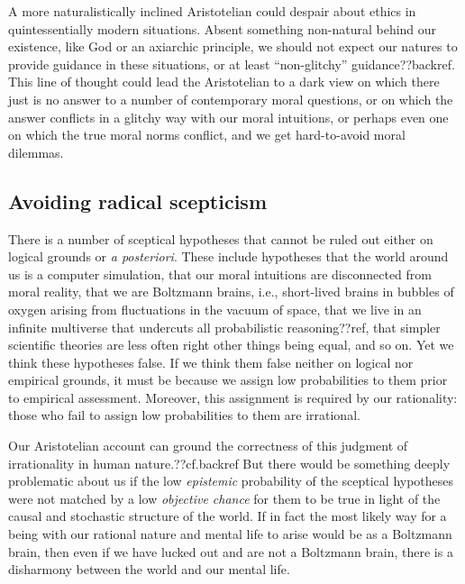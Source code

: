 A more naturalistically inclined Aristotelian could despair about ethics in quintessentially modern situations. 
Absent something non-natural behind our existence, like God or an axiarchic principle, we should not expect our natures to provide guidance in these situations, or at least ``non-glitchy''
guidance??backref. This line of thought could lead the Aristotelian to a dark view on which there just is no answer to a number
of contemporary moral questions, or on which the answer conflicts in a glitchy way with our moral intuitions, or perhaps
even one on which the true moral norms conflict, and we get hard-to-avoid moral dilemmas. 

\subsection{Avoiding radical scepticism}
There is a number of sceptical hypotheses that cannot be ruled out either on logical grounds
or \textit{a posteriori}. These include hypotheses that the world around us is a computer simulation, that our moral
intuitions are disconnected from moral reality, that we are Boltzmann brains, i.e., short-lived brains in bubbles of 
oxygen arising from fluctuations in the vacuum of space, that we live in an infinite multiverse that undercuts all
probabilistic reasoning??ref, that simpler scientific theories are less often right other things being equal, and so 
on. Yet we think these hypotheses false. If we think them false neither on logical nor empirical grounds, it must be 
because we assign low probabilities to them prior to empirical assessment. Moreover, this assignment is required by 
our rationality: those who fail to assign low probabilities to them are irrational.

Our Aristotelian account can ground the correctness of this judgment of irrationality in human nature.??cf.backref 
But there would be something deeply problematic about us if the low \textit{epistemic} probability of the sceptical hypotheses 
were not matched by a low \textit{objective chance} for them to be true in light of the causal and stochastic structure of the world. 
If in fact the most likely way for a being with our rational nature and mental life to arise would be as a Boltzmann
brain, then even if we have lucked out and are not a Boltzmann brain, there is a disharmony between the world and our
mental life. 

